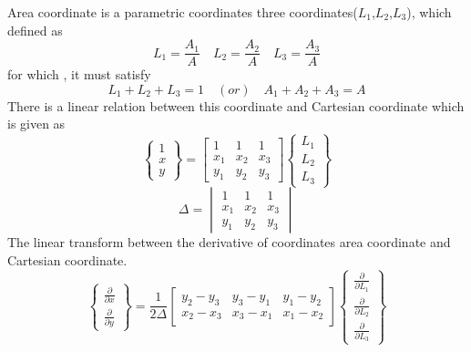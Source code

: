\documentclass[main.tex]{subfiles}
\begin{document}
Area coordinate is a parametric coordinates three coordinates($L_1$,$L_2$,$L_3$), which defined as
\begin{equation}
L_1 = \frac{A_1}{A} \quad L_2 = \frac{A_2}{A} \quad L_3 = \frac{A_3}{A}
\end{equation}
for which , it must satisfy
\begin{equation}
L_1 + L_2 + L_3 = 1 \quad (or) \quad A_1 + A_2 + A_3 = A
\end{equation}
There is a linear relation between this coordinate and Cartesian coordinate which is given as
\begin{equation}
\left\{
\begin{array}{r}
1\\
x \\
y
\end{array} \right\}
=
\begin{bmatrix}
1 & 1 & 1 \\
x_1 & x_2 & x_3 \\
y_1 & y_2 & y_3  
\end{bmatrix} 
\left\{
\begin{array}{r}
L_1\\
L_2 \\
L_3
\end{array} \right\}
\end{equation}
\begin{equation}
\Delta = \begin{vmatrix}
1 & 1 & 1 \\
x_1 & x_2 & x_3 \\
y_1 & y_2 & y_3  
\end{vmatrix} 
\end{equation}
The linear transform between the derivative of coordinates area coordinate and Cartesian coordinate.
\begin{equation}
\left\{
\begin{array}{r}
 \frac{\partial}{\partial x}\\
\frac{\partial}{\partial y}
\end{array} \right\}
=
\frac{1}{2 \Delta}
\begin{bmatrix}
y_2-y_3 & y_3-y_1 & y_1-y_2 \\
x_2-x_3 & x_3-x_1 & x_1-x_2
\end{bmatrix} 
\left\{
\begin{array}{r}
 \frac{\partial}{\partial L_1}\\
 \frac{\partial}{\partial L_2}\\
 \frac{\partial}{\partial L_3}
\end{array} \right\}
\end{equation}
\end{document}
